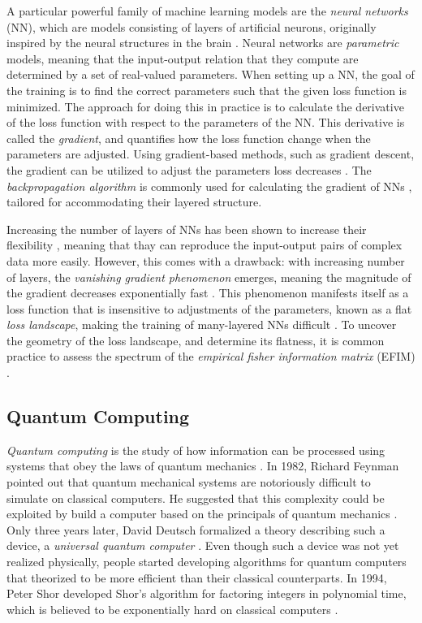 A particular powerful family of machine learning models are the \emph{neural networks} (NN), which are models consisting of layers of artificial neurons, originally inspired by the neural structures in the brain \cite{hands-on}. Neural networks are \emph{parametric} models, meaning that the input-output relation that they compute are determined by a set of real-valued parameters. When setting up a NN, the goal of the training is to find the correct parameters such that the given loss function is minimized. The approach for doing this in practice is to calculate the derivative of the loss function with respect to the parameters of the NN. This derivative is called the \emph{gradient}, and quantifies how the loss function change when the parameters are adjusted. Using gradient-based methods, such as gradient descent, the gradient can be utilized to adjust the parameters loss decreases \cite{hands-on}. The \emph{backpropagation algorithm} is commonly used for calculating the gradient of NNs \cite{hands-on}, tailored for accommodating their layered structure. 

Increasing the number of layers of NNs has been shown to increase their flexibility \cite{raghu2017expressive}, meaning that thay can reproduce the input-output pairs of complex data more easily. However, this comes with a drawback: with increasing number of layers, the \emph{vanishing gradient phenomenon} emerges, meaning the magnitude of the gradient decreases exponentially fast \cite{LeCun2012}. This phenomenon manifests itself as a loss function that is insensitive to adjustments of the parameters, known as a flat \emph{loss landscape}, making the training of many-layered NNs difficult \cite{karakida2019universal}. To uncover the geometry of the loss landscape, and determine its flatness, it is common practice to assess the spectrum of the \emph{empirical fisher information matrix} (EFIM) \cite{karakida2019universal}.


\subsection{Quantum Computing}\label{sec:Quantum Computing Intro}
\emph{Quantum computing} is the study of how information can be processed using systems that obey the laws of quantum mechanics \cite{NielsenQuantum}. In 1982, Richard Feynman pointed out that quantum mechanical systems are notoriously difficult to simulate on classical computers. He suggested that this complexity could be exploited by build a computer based on the principals of quantum mechanics \cite{NielsenQuantum}. Only three years later, David Deutsch formalized a theory describing such a device, a \emph{universal quantum computer} \cite{Deutsch1985QuantumTT}. Even though such a device was not yet realized physically, people started developing algorithms for quantum computers that theorized to be more efficient than their classical counterparts. In 1994, Peter Shor developed Shor's algorithm for factoring integers in polynomial time, which is believed to be exponentially hard on classical computers \cite{Shor_1997}.  

